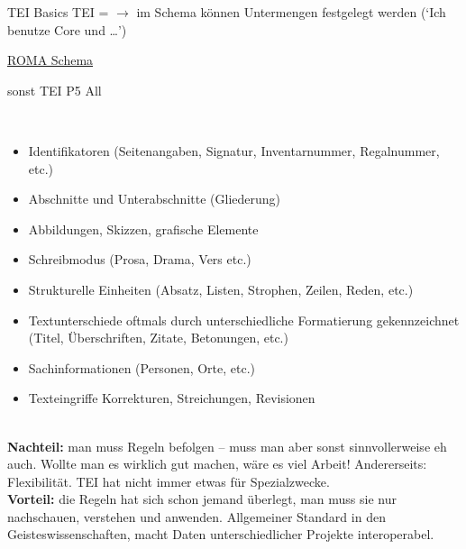 \begin{frame}[allowframebreaks]{TEI Basics}
\footnotesize
TEI =  $\to$ im Schema können Untermengen festgelegt werden (`Ich benutze Core und \dots ') \item \href{http://www.tei-c.org/Roma/}{ROMA Schema} \item sonst TEI P5 All
\smallskip

 \\

\begin{itemize}\footnotesize
    \item Identifikatoren (Seitenangaben, Signatur, Inventarnummer, Regalnummer, etc.)
    \item Abschnitte und Unterabschnitte (Gliederung)
    \item Abbildungen, Skizzen, grafische Elemente
    \item Schreibmodus (Prosa, Drama, Vers etc.)
    \item Strukturelle Einheiten (Absatz, Listen, Strophen, Zeilen, Reden, etc.)
    \item Textunterschiede oftmals durch unterschiedliche Formatierung gekennzeichnet (Titel, Überschriften, Zitate, Betonungen, etc.)
    \item Sachinformationen (Personen, Orte, etc.)
    \item Texteingriffe Korrekturen, Streichungen, Revisionen
\end{itemize}
\vspace{1em}

 \\
\textbf{Nachteil:} man muss Regeln befolgen -- muss man aber sonst sinnvollerweise eh auch. Wollte man es wirklich gut machen, wäre es viel Arbeit! Andererseits: Flexibilität. TEI hat nicht immer etwas für Spezialzwecke. \\
\textbf{Vorteil:} die Regeln hat sich schon jemand überlegt, man muss sie nur nachschauen, verstehen und anwenden. Allgemeiner Standard in den Geisteswissenschaften, macht Daten unterschiedlicher Projekte interoperabel.
\end{frame}


